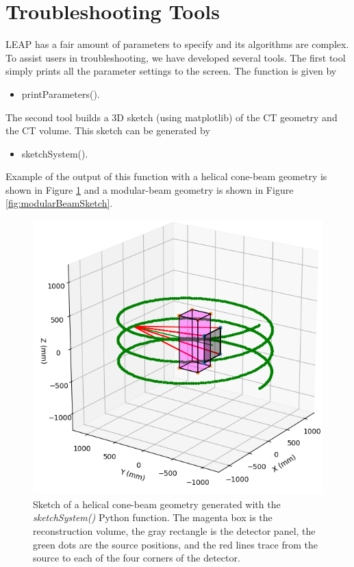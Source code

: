 \documentclass[11pt]{article}
\begin{document}
\section{Troubleshooting Tools}

LEAP has a fair amount of parameters to specify and its algorithms are complex.  To assist users in troubleshooting, we have developed several tools.  The first tool simply prints all the parameter settings to the screen.  The function is given by
\begin{itemize}
    \item[] printParameters().
\end{itemize}
The second tool builds a 3D sketch (using matplotlib) of the CT geometry and the CT volume.  This sketch can be generated by
\begin{itemize}
    \item[] sketchSystem().
\end{itemize}
Example of the output of this function with a helical cone-beam geometry is shown in Figure \ref{fig:helicalSketch} and a modular-beam geometry is shown in Figure \ref{fig:modularBeamSketch}.

\begin{figure}[h!]
\begin{center}
\includegraphics[scale=0.5]{helical}
\end{center}
\vspace{-20pt}\caption{Sketch of a helical cone-beam geometry generated with the \textit{sketchSystem()} Python function.  The  magenta box is the reconstruction volume, the gray rectangle is the detector panel, the green dots are the source positions, and the red lines trace from the source to each of the four corners of the detector.} \label{fig:helicalSketch}
\end{figure}
\end{document}
